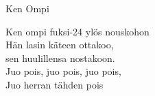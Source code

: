 \begin{song}{Ken Ompi}
    
    \repetitionbegin{} Ken ompi fuksi-24 ylös nouskohon \repetitionend{}\\
    Hän lasin käteen ottakoo,\\
    sen huulillensa nostakoon.\\
    \repetitionbegin{} Juo pois, juo pois, juo pois,\\
    Juo herran tähden pois \repetitionend{}

\end{song}